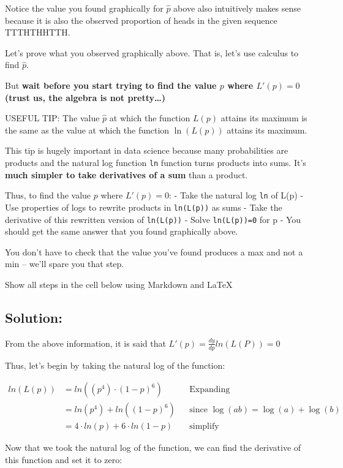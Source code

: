 \documentclass[11pt]{article}
\begin{document}
Notice the value you found graphically for \(\hat{p}\) above also
intuitively makes sense because it is also the observed proportion of
heads in the given sequence TTTHTHHTTH.

Let's prove what you observed graphically above. That is, let's use
calculus to find \(\hat{p}\).

But \textbf{wait before you start trying to find the value \(p\) where
\(L'(p)=0\) (trust us, the algebra is not pretty\ldots)}

USEFUL TIP: The value \(\hat{p}\) at which the function \(L(p)\) attains
its maximum is the same as the value at which the function \(\ln(L(p))\)
attains its maximum.

This tip is hugely important in data science because many probabilities
are products and the natural log function \texttt{ln} function turns
products into sums. It's \textbf{much simpler to take derivatives of a
sum} than a product.

Thus, to find the value \(p\) where \(L'(p)=0\): - Take the natural log
\texttt{ln} of L(p) - Use properties of logs to rewrite products in
\texttt{ln(L(p))} as sums - Take the derivative of this rewritten
version of \texttt{ln(L(p))} - Solve \texttt{ln(L(p))=0} for p - You
should get the same answer that you found graphically above.

You don't have to check that the value you've found produces a max and
not a min -- we'll spare you that step.

Show all steps in the cell below using Markdown and LaTeX

    \subsection{\texorpdfstring{\textbf{Solution:}}{Solution:}}\label{solution}

From the above information, it is said that
\(L'(p) = \frac{dy}{dp} ln(L(P)) = 0\)

Thus, let's begin by taking the natural log of the function:

\[
\begin{align*}
    ln(L(p))  &=  ln((p^4) \cdot (1-p) ^ 6) && \text{Expanding} \\
    &= ln(p^4) + ln((1-p) ^ 6) && \text{since $\log(ab) = \log(a) + \log(b)$} \\
    &= 4\cdot ln(p) + 6\cdot ln(1-p) && \text{simplify} 
\end{align*}
\]

Now that we took the natural log of the function, we can find the
derivative of this function and set it to zero:
\end{document}
